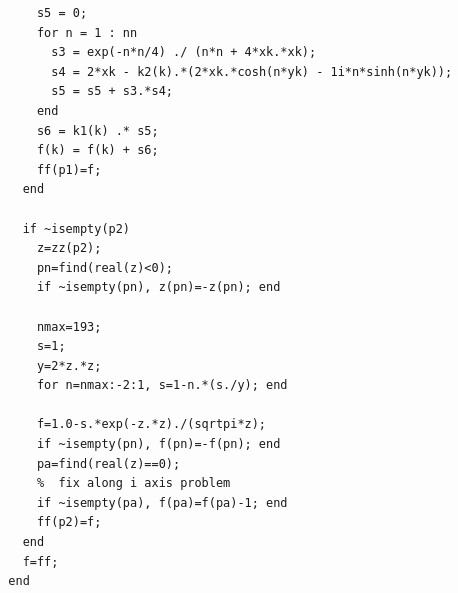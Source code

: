 \documentclass[12pt,twoside,a4paper]{article}
\numberwithin{equation}{subsection}
\numberwithin{figure}{subsection}
\begin{document}
\begin{lstlisting}
      s5 = 0;
      for n = 1 : nn
        s3 = exp(-n*n/4) ./ (n*n + 4*xk.*xk);
        s4 = 2*xk - k2(k).*(2*xk.*cosh(n*yk) - 1i*n*sinh(n*yk));
        s5 = s5 + s3.*s4;
      end
      s6 = k1(k) .* s5;
      f(k) = f(k) + s6;
      ff(p1)=f;
    end

    if ~isempty(p2)
      z=zz(p2);
      pn=find(real(z)<0);
      if ~isempty(pn), z(pn)=-z(pn); end

      nmax=193;
      s=1;
      y=2*z.*z;
      for n=nmax:-2:1, s=1-n.*(s./y); end

      f=1.0-s.*exp(-z.*z)./(sqrtpi*z);
      if ~isempty(pn), f(pn)=-f(pn); end
      pa=find(real(z)==0);
      %  fix along i axis problem
      if ~isempty(pa), f(pa)=f(pa)-1; end
      ff(p2)=f;
    end
    f=ff;
  end
		
	    
		  
\end{lstlisting}
\end{document}
